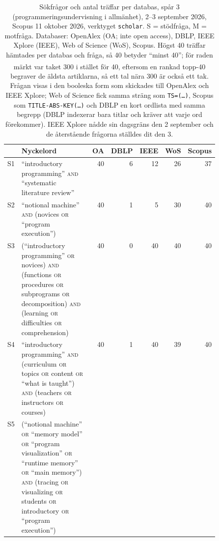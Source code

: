 \begin{table}[tbp]
  \centering
  \caption{Sökfrågor och antal träffar per databas, spår 3
    (programmeringsundervisning i allmänhet),
    2--3 september 2026, Scopus 11 oktober 2026, verktyget \texttt{scholar}.  S = stödfråga, M = motfråga.
    Databaser: OpenAlex (OA; inte \foreignlanguage{english}{open access}),
    DBLP, IEEE Xplore (IEEE), Web of Science (WoS), Scopus.  Högst 40
    träffar hämtades per databas och fråga, så 40 betyder \enquote{minst
    40}; för raden märkt \textsuperscript{\dag} var taket 300 i stället
    för 40, eftersom en rankad topp-40 begraver de äldsta artiklarna, så
    ett tal nära 300 är också ett tak.  Frågan visas i den
    booleska form som skickades till OpenAlex
    och IEEE Xplore; Web of Science fick samma sträng som
    \texttt{TS=(\dots)}, Scopus som \texttt{TITLE-ABS-KEY(\dots)} och DBLP
    en kort ordlista med samma begrepp (DBLP indexerar bara titlar och
    kräver att varje ord förekommer).  IEEE Xplore nådde sin
    dagsgräns den 2 september och de återstående frågorna ställdes dit
    den 3.}
  \label{tab:sok-queries-3}
  \footnotesize
  \begin{tabular}{@{}lp{0.5\linewidth}rrrrr@{}}
    \toprule
    & Nyckelord & OA & DBLP & IEEE & WoS & Scopus \\
    \midrule
    S1 & \enquote{introductory programming} \textsc{and} \enquote{systematic literature review}
       & 40 & 6 & 12 & 26 & 37 \\
    S2 & \enquote{notional machine} \textsc{and} (novices \textsc{or} \enquote{program execution})
       & 40 & 1 & 5 & 30 & 40 \\
    S3 & (\enquote{introductory programming} \textsc{or} novices) \textsc{and} (functions \textsc{or} procedures \textsc{or} subprograms \textsc{or} decomposition) \textsc{and} (learning \textsc{or} difficulties \textsc{or} comprehension)
       & 40 & 0 & 40 & 40 & 40 \\
    S4 & \enquote{introductory programming} \textsc{and} (curriculum \textsc{or} topics \textsc{or} content \textsc{or} \enquote{what is taught}) \textsc{and} (teachers \textsc{or} instructors \textsc{or} courses)
       & 40 & 1 & 40 & 39 & 40 \\
    S5 & (\enquote{notional machine} \textsc{or} \enquote{memory model} \textsc{or} \enquote{program visualization} \textsc{or} \enquote{runtime memory} \textsc{or} \enquote{main memory}) \textsc{and} (tracing \textsc{or} visualizing \textsc{or} students \textsc{or} introductory \textsc{or} \enquote{program execution})

\end{tabular}
\end{table}
